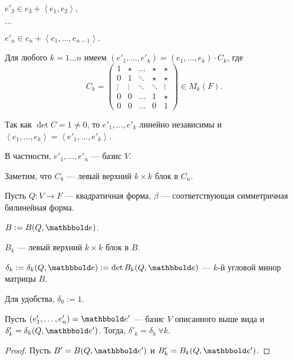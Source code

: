 \documentclass[a4paper]{article}
\begin{document}
\begin{colloq}
            $e'_3 \in e_3 + \left< e_1, e_2 \right>$,

            $\dots$

            $e'_n \in e_n + \left< e_1, \dots, e_{n - 1} \right>$.

            Для любого $k = 1 \dots n$ имеем $(e'_1, \dots, e'_k) = (e_1, \dots, e_k) \cdot C_k$, где
            \begin{equation*}
                C_k = \begin{pmatrix} 
                    1 & \star & \dots & \star & \star \\
                    0 & 1 & \ddots & \star & \star \\
                    \vdots & \vdots & \ddots & \ddots & \vdots \\
                    0 & 0 & \dots & 1 & \star \\
                    0 & 0 & \dots & 0 & 1
                \end{pmatrix} \in M_k(F)
            .\end{equation*}

            Так как $\det C = 1 \neq 0$, то $e'_1, \dots, e'_k$ линейно независимы и $\left< e_1, \dots, e_k \right> = \left< e'_1, \dots, e'_k \right>$.

            В частности, $e'_1, \dots, e'_n$ --- базис $V$.

            Заметим, что $C_k$ --- левый верхний $k \times k$ блок в $C_n$.

            Пусть $Q \colon V \to F$ --- квадратичная форма, $\beta$ --- соответствующая симметричная билинейная форма.

            $B := B(Q, \E)$.

            $B_k$ --- левый верхний $k \times k$ блок в $B$.

            $\delta_k := \delta_k(Q, \E) := \det B_k(Q, \E)$ --- $k$-й угловой минор матрицы $B$.

            Для удобства, $\delta_0 := 1$.

            \begin{lemma}
                Пусть $(e'_1, \dots, e'_n) = \E'$ --- базис $V$ описанного выше вида и $\delta'_k = \delta_k(Q, \E')$. Тогда, $\delta'_k = \delta_k \ \forall k$.
            \end{lemma}

            \begin{proof}
                Пусть $B' = B(Q, \E')$ и $B'_k = B_k(Q, \E')$.


\end{proof}
\end{colloq}
\end{document}
